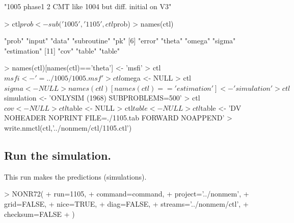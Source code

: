 \begin{Schunk}
\begin{Soutput}
[1] "1005 phase1 2 CMT like 1004 but diff. initial on V3"
\end{Soutput}
\begin{Sinput}
> ctl$prob <- sub('1005','1105',ctl$prob)
> names(ctl)
\end{Sinput}
\begin{Soutput}
 [1] "prob"       "input"      "data"       "subroutine" "pk"        
 [6] "error"      "theta"      "omega"      "sigma"      "estimation"
[11] "cov"        "table"      "table"     
\end{Soutput}
\begin{Sinput}
> names(ctl)[names(ctl)=='theta'] <- 'msfi'
> ctl$msfi <- '=../1005/1005.msf'
> ctl$omega <- NULL
> ctl$sigma <- NULL
> names(ctl)[names(ctl)=='estimation'] <- 'simulation'
> ctl$simulation <- 'ONLYSIM (1968) SUBPROBLEMS=500'
> ctl$cov <- NULL
> ctl$table <- NULL
> ctl$table <- NULL
> ctl$table <- 'DV NOHEADER NOPRINT FILE=./1105.tab FORWARD NOAPPEND'
> write.nmctl(ctl,'../nonmem/ctl/1105.ctl')
\end{Sinput}
\end{Schunk}
\subsection{Run the simulation.}
This run makes the predictions (simulations).
\begin{Schunk}
\begin{Sinput}
> NONR72(
+      run=1105,
+      command=command,
+      project='../nonmem',
+      grid=FALSE,
+      nice=TRUE,
+      diag=FALSE,
+      streams='../nonmem/ctl',
+      checksum=FALSE
+ )
\end{Sinput}
\end{Schunk}
